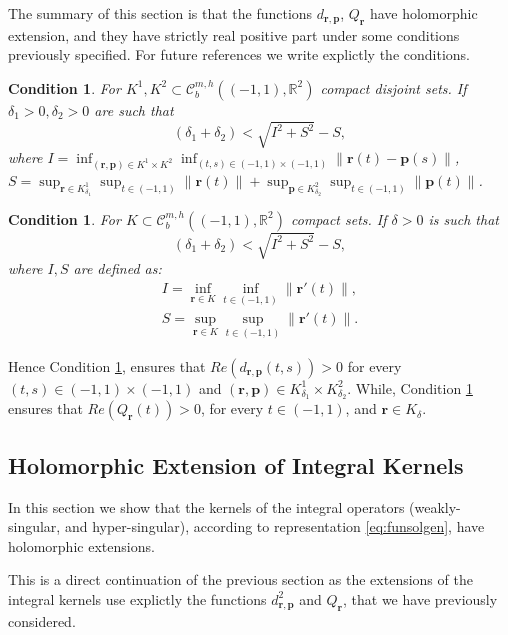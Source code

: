 \documentclass{article}
\newtheorem{condition}[theorem]{Condition}
\newcommand{\IR}{{\mathbb R}}
\newcommand{\bp}{{\bm p}}
\newcommand{\rgeoh}[2]{\mathcal{C}_b^{#1,#2}\left( (-1,1), \IR^2 \right)}
\newcommand{\br}{\bm{r}}
\newcommand{\iinterv}{(-1,1)\times(-1,1)}
\begin{document}
The summary of this section is that the functions $d_{\br,\bp}$, $Q_{\br}$ have holomorphic extension, and they have strictly real positive part under some conditions previously specified. For future references we write explictly the conditions.

\begin{condition}
\label{condition:dcross}
For $K^1,K^2 \subset \rgeoh{m}{h}$ compact disjoint sets. If $\delta_1>0,\delta_2>0$ are such that 
$$
(\delta_1 + \delta_2) < \sqrt{I^2+S^2}-S,
$$
where $I=\inf_{(\br,\bp) \in K^1 \times K^2} \inf_{(t,s) \in (-1,1)\times(-1,1)}
 \| \br(t) - \bp(s) \|$, $S = \sup_{\br \in K^1_{\delta_1}} \sup_{t \in (-1,1)} \| \br(t)\| +
\sup_{\bp \in K^2_{\delta_2}} \sup_{t \in (-1,1)} \| \bp(t)\|$. 
\end{condition}

\begin{condition}
\label{condition:Qself}
For $K \subset \rgeoh{m}{h}$ compact  sets. If $\delta>0 $ is such that 
$$
(\delta_1 + \delta_2) < \sqrt{I^2+S^2}-S,
$$
where $I,S$ are defined as:
\begin{align*}
 I = \inf_{\br \in K} \inf_{t \in (-1,1)} \| \br'(t)\|,\\
 S = \sup_{\br \in K} \sup_{t \in (-1,1)} \|\br'(t)\|.
\end{align*} 
\end{condition}
Hence Condition \ref{condition:dcross}, ensures that $Re(d_{\br,\bp}(t,s))>0$ for every $(t,s) \in \iinterv$ and $(\br,\bp) \in K^1_{\delta_1} \times K^2_{\delta_2}$. While, Condition \ref{condition:Qself} ensures that $Re(Q_{\br}(t)) >0$, for every $t \in (-1,1)$, and $\br \in K_\delta$. 

\subsection{Holomorphic Extension of Integral Kernels}
In this section we show that the kernels of the integral operators (weakly-singular, and hyper-singular), according to representation \eqref{eq:funsolgen}, have holomorphic extensions. 

This is a direct continuation of the previous section as the extensions of the integral kernels use explictly the functions $d_{\br,\bp}^2$ and $Q_{\br}$, that we have previously considered.
\end{document}
